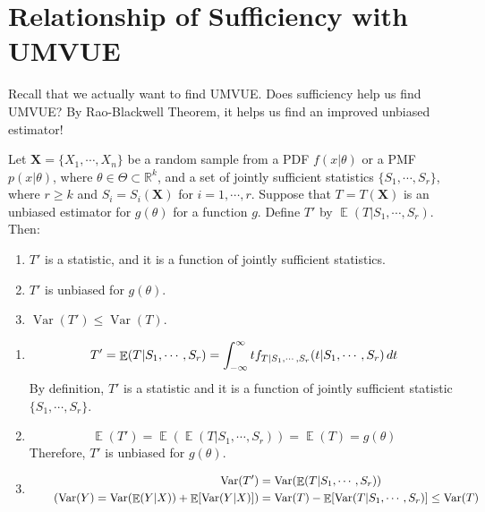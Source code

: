 \documentclass{huhtakm-template-book-v2}
\DeclareMathOperator{\E}{\mathbb{E}}
\DeclareMathOperator{\Var}{Var}
\begin{document}
\section{Relationship of Sufficiency with UMVUE}
Recall that we actually want to find UMVUE. Does sufficiency help us find UMVUE? By Rao-Blackwell Theorem, it helps us find an improved unbiased estimator!
\begin{thm}
	Let $\mathbf{X}=\{X_{1},\cdots,X_{n}\}$ be a random sample from a PDF $f(x|\theta)$ or a PMF $p(x|\theta)$, where $\theta\in\Theta\subset\mathbb{R}^{k}$, and a set of jointly sufficient statistics $\{S_{1},\cdots,S_{r}\}$, where $r\geq k$ and $S_{i}=S_{i}(\mathbf{X})$ for $i=1,\cdots,r$. Suppose that $T=T(\mathbf{X})$ is an unbiased estimator for $g(\theta)$ for a function $g$. Define $T'$ by $\E(T|S_{1},\cdots,S_{r})$. Then:
	\begin{enumerate}
		\item $T'$ is a statistic, and it is a function of jointly sufficient statistics.
		\item $T'$ is unbiased for $g(\theta)$.
		\item $\Var(T')\leq\Var(T)$.
	\end{enumerate}
\end{thm}
\begin{proofing}
	\begin{enumerate}
		\item 
		\begin{equation*}
			T'=\E(T|S_{1},\cdots,S_{r})=\intinfty tf_{T|S_{1},\cdots,S_{r}}(t|S_{1},\cdots,S_{r})\,dt
		\end{equation*}
		By definition, $T'$ is a statistic and it is a function of jointly sufficient statistic $\{S_{1},\cdots,S_{r}\}$.
		\item 
		\begin{equation*}
			\E(T')=\E(\E(T|S_{1},\cdots,S_{r}))=\E(T)=g(\theta)
		\end{equation*}
		Therefore, $T'$ is unbiased for $g(\theta)$.
		\item 
		\begin{align*}
			\Var(T')&=\Var(\E(T|S_{1},\cdots,S_{r}))\\
			\tag{$\Var(Y)=\Var(\E(Y|X))+\E[\Var(Y|X)]$}
			&=\Var(T)-\E[\Var(T|S_{1},\cdots,S_{r})]\leq\Var(T)
		\end{align*}
	\end{enumerate}
\end{proofing}
\end{document}
